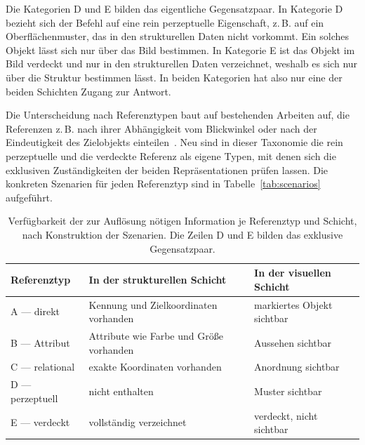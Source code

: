 Die Kategorien D und E bilden das eigentliche Gegensatzpaar.
In Kategorie D bezieht sich der Befehl auf eine rein perzeptuelle Eigenschaft, z.\,B. auf ein Oberflächenmuster, das in den strukturellen Daten nicht vorkommt.
Ein solches Objekt lässt sich nur über das Bild bestimmen.
In Kategorie E ist das Objekt im Bild verdeckt und nur in den strukturellen Daten verzeichnet, weshalb es sich nur über die Struktur bestimmen lässt.
In beiden Kategorien hat also nur eine der beiden Schichten Zugang zur Antwort.

Die Unterscheidung nach Referenztypen baut auf bestehenden Arbeiten auf, die Referenzen z.\,B. nach ihrer Abhängigkeit vom Blickwinkel oder nach der Eindeutigkeit des Zielobjekts einteilen~\cite{achlioptas2020, chen2020}.
Neu sind in dieser Taxonomie die rein perzeptuelle und die verdeckte Referenz als eigene Typen, mit denen sich die exklusiven Zuständigkeiten der beiden Repräsentationen prüfen lassen.
Die konkreten Szenarien für jeden Referenztyp sind in Tabelle~\ref{tab:scenarios} aufgeführt.

\begin{table}[ht]
  \centering
  \caption{Verfügbarkeit der zur Auflösung nötigen Information je Referenztyp und Schicht, nach Konstruktion der Szenarien. Die Zeilen D und E bilden das exklusive Gegensatzpaar.}
  \label{tab:taxonomy}
  \small
  \setlength{\tabcolsep}{5pt}
  \renewcommand{\arraystretch}{1.3}
  \begin{tabular}{@{}p{2.9cm} p{5.1cm} p{5.1cm}@{}}
    \toprule
    Referenztyp & In der strukturellen Schicht & In der visuellen Schicht \\
    \midrule
    A — direkt        & Kennung und Zielkoordinaten vorhanden & markiertes Objekt sichtbar \\
    B — Attribut      & Attribute wie Farbe und Größe vorhanden & Aussehen sichtbar \\
    C — relational    & exakte Koordinaten vorhanden & Anordnung sichtbar \\
    D — perzeptuell   & nicht enthalten & Muster sichtbar \\
    E — verdeckt      & vollständig verzeichnet & verdeckt, nicht sichtbar \\
    \bottomrule
  \end{tabular}
\end{table}

